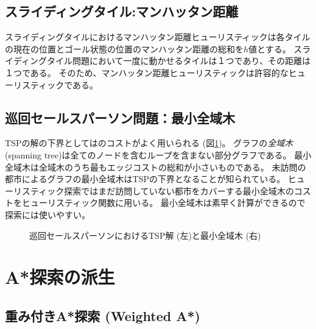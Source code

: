 \subsection{スライディングタイル:マンハッタン距離}
スライディングタイルにおけるマンハッタン距離ヒューリスティックは各タイルの現在の位置とゴール状態の位置のマンハッタン距離の総和を$h$値とする。
スライディングタイル問題において一度に動かせるタイルは１つであり、その距離は１つである。
そのため、マンハッタン距離ヒューリスティックは許容的なヒューリスティックである。



\subsection{巡回セールスパーソン問題：最小全域木}
TSPの解の下界としてはのコストがよく用いられる (図\ref{fig:tsp-mst})。
グラフの{\it 全域木} (spanning tree)は全てのノードを含むループを含まない部分グラフである。
最小全域木は全域木のうち最もエッジコストの総和が小さいものである。
未訪問の都市によるグラフの最小全域木はTSPの下界となることが知られている。
ヒューリスティック探索ではまだ訪問していない都市をカバーする最小全域木のコストをヒューリスティック関数に用いる。
最小全域木は素早く計算ができるので探索には使いやすい。

\begin{figure}[tbh]
  \centering
  \begin{tikzpicture}[scale=0.6]
    
  \end{tikzpicture}
\caption{巡回セールスパーソンにおけるTSP解 (左)と最小全域木 (右)}
\label{fig:tsp-mst}
\end{figure}

\section{A*探索の派生}

\subsection{重み付きA*探索 (Weighted A*)}
\label{sec:weighted-astar-search}

